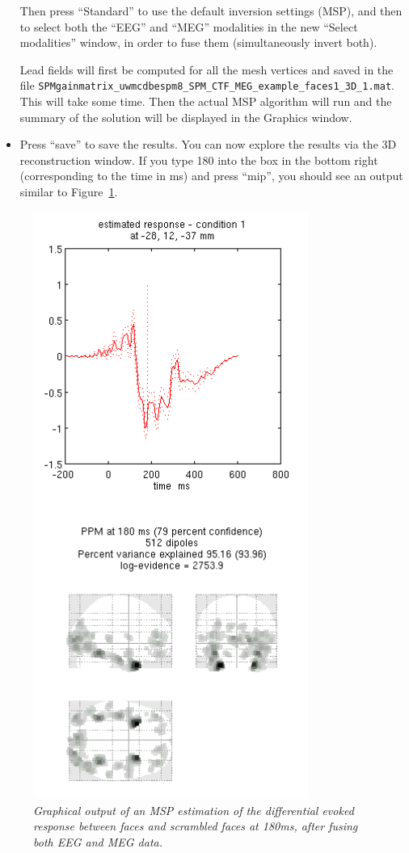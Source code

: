 \begin{itemize}
Then press ``Standard'' to use the default inversion settings (MSP), and then to select both the ``EEG'' and ``MEG'' modalities in the new ``Select modalities'' window, in order to fuse them (simultaneously invert both).

Lead fields will first be computed for all the mesh vertices and saved in the file \texttt{SPMgainmatrix\_uwmcdbespm8\_SPM\_CTF\_MEG\_example\_faces1\_3D\_1.mat}. 
This will take some time.
Then the actual MSP algorithm will run and the summary of the solution will be displayed in the Graphics window.

\item Press ``save'' to save the results. You can now explore the results via the 3D reconstruction window. If you type 180 into the box in the bottom right (corresponding to the time in ms) and press ``mip'', you should see an output similar to Figure~\ref{multimodal:fusion:fig:1}.
\end{itemize}

\begin{figure}
\begin{center}
\includegraphics[width=90mm]{multimodal/figures/fused_eeg_meg_msp.png}
\caption{\em Graphical output of an MSP estimation of the differential evoked response between faces and scrambled faces at 180ms, after fusing both EEG and MEG data. \label{multimodal:fusion:fig:1}}
\end{center}
\end{figure}

